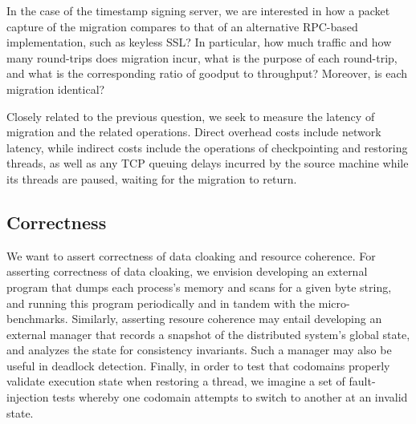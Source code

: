 In the case of the timestamp signing server, we are interested in how a packet
capture of the migration compares to that of an alternative RPC-based
implementation, such as keyless SSL\@?
%
In particular, how much traffic and how many round-trips does migration incur,
what is the purpose of each round-trip, and what is the corresponding ratio of
goodput to throughput?
%
Moreover, is each migration identical?


Closely related to the previous question, we seek to measure the latency of
migration and the related operations.
%
Direct overhead costs include network latency, while indirect costs include the
operations of checkpointing and restoring threads, as well as any TCP queuing
delays incurred by the source machine while its threads are paused, waiting for
the migration to return.

\subsection{Correctness}

We want to assert correctness of data cloaking and resource coherence.
%
For asserting correctness of data cloaking, we envision developing an external
program that dumps each process's memory and scans for a given byte string,
and running this program periodically and in tandem with the micro-benchmarks.
%
Similarly, asserting resoure coherence may entail developing an external
manager that records a snapshot of the distributed system's global state, and
analyzes the state for consistency invariants.
%
Such a manager may also be useful in deadlock detection.
%
Finally, in order to test that codomains properly validate execution state when
restoring a thread, we imagine a set of fault-injection tests whereby one
codomain attempts to switch to another at an invalid state.
